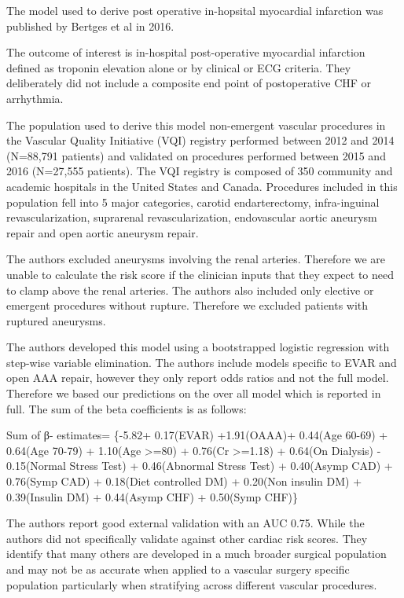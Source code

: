 \documentclass[
]{book}
\begin{document}
The model used to derive post operative in-hopsital myocardial infarction was published by Bertges et al in 2016. \citet{bertgesVascularQualityInitiative2016}

The outcome of interest is in-hospital post-operative myocardial infarction defined as troponin elevation alone or by clinical or ECG criteria. They deliberately did not include a composite end point of postoperative CHF or arrhythmia.

The population used to derive this model non-emergent vascular procedures in the Vascular Quality Initiative (VQI) registry performed between 2012 and 2014 (N=88,791 patients) and validated on procedures performed between 2015 and 2016 (N=27,555 patients). The VQI registry is composed of 350 community and academic hospitals in the United States and Canada. Procedures included in this population fell into 5 major categories, carotid endarterectomy, infra-inguinal revascularization, suprarenal revascularization, endovascular aortic aneurysm repair and open aortic aneurysm repair.

The authors excluded aneurysms involving the renal arteries. Therefore we are unable to calculate the risk score if the clinician inputs that they expect to need to clamp above the renal arteries. The authors also included only elective or emergent procedures without rupture. Therefore we excluded patients with ruptured aneurysms.

The authors developed this model using a bootstrapped logistic regression with step-wise variable elimination. The authors include models specific to EVAR and open AAA repair, however they only report odds ratios and not the full model. Therefore we based our predictions on the over all model which is reported in full. The sum of the beta coefficients is as follows:

Sum of β- estimates= \{-5.82+ 0.17(EVAR) +1.91(OAAA)+ 0.44(Age 60-69) + 0.64(Age 70-79) + 1.10(Age \textgreater=80) + 0.76(Cr \textgreater=1.18) + 0.64(On Dialysis) - 0.15(Normal Stress Test) + 0.46(Abnormal Stress Test) + 0.40(Asymp CAD) + 0.76(Symp CAD) + 0.18(Diet controlled DM) + 0.20(Non insulin DM) + 0.39(Insulin DM) + 0.44(Asymp CHF) + 0.50(Symp CHF)\}

The authors report good external validation with an AUC 0.75. While the authors did not specifically validate against other cardiac risk scores. They identify that many others are developed in a much broader surgical population and may not be as accurate when applied to a vascular surgery specific population particularly when stratifying across different vascular procedures. \citep{bertgesVascularStudyGroup2010, guptaDevelopmentValidationRisk2011a}
\end{document}
